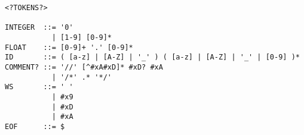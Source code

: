\begin{verbatim}
<?TOKENS?>

INTEGER  ::= '0'
           | [1-9] [0-9]*
FLOAT    ::= [0-9]+ '.' [0-9]*
ID       ::= ( [a-z] | [A-Z] | '_' ) ( [a-z] | [A-Z] | '_' | [0-9] )*
COMMENT? ::= '//' [^#xA#xD]* #xD? #xA
           | '/*' .* '*/'
WS       ::= ' '
           | #x9
           | #xD
           | #xA
EOF      ::= $
\end{verbatim}
